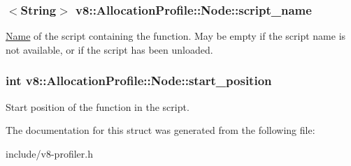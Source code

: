 \subsubsection[{\texorpdfstring{script\+\_\+name}{script_name}}]{$<${\bf String}$>$ v8\+::\+Allocation\+Profile\+::\+Node\+::script\+\_\+name}\hypertarget{structv8_1_1_allocation_profile_1_1_node_acd6567ac06a0bae713390559128e9c62}{}\label{structv8_1_1_allocation_profile_1_1_node_acd6567ac06a0bae713390559128e9c62}
\hyperlink{classv8_1_1_name}{Name} of the script containing the function. May be empty if the script name is not available, or if the script has been unloaded. 
\subsubsection[{\texorpdfstring{start\+\_\+position}{start_position}}]{\setlength{\rightskip}{0pt plus 5cm}int v8\+::\+Allocation\+Profile\+::\+Node\+::start\+\_\+position}\hypertarget{structv8_1_1_allocation_profile_1_1_node_a6caceefbf826a0425adc74331cc7a910}{}\label{structv8_1_1_allocation_profile_1_1_node_a6caceefbf826a0425adc74331cc7a910}
Start position of the function in the script. 

The documentation for this struct was generated from the following file\+:\begin{DoxyCompactItemize}
\item 
include/v8-\/profiler.\+h\end{DoxyCompactItemize}
